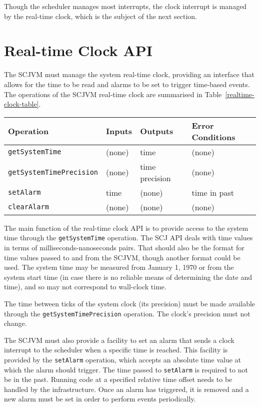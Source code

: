 Though the scheduler manages most interrupts, the clock interrupt is
managed by the real-time clock, which is the subject of the next section.

\section{Real-time Clock API}
\label{realtime-clock-section}

The SCJVM must manage the system real-time clock, providing an
interface that allows for the time to be read and alarms to be set to
trigger time-based events.
The operations of the SCJVM real-time clock are summarised in
Table~\ref{realtime-clock-table}.

\begin{table*}[ht]
  \centering
  \footnotesize
  \begin{tabular}{|l|p{1.2cm}|p{2cm}|p{2.6cm}|}
    Operation & Inputs & Outputs & Error Conditions \\
    \hline
    \texttt{getSystemTime} &
    (none) &
    time &
    (none)
    \\\texttt{getSystemTimePrecision} &
    (none) &
    time precision &
    (none)
    \\\texttt{setAlarm} &
    time &
    (none) &
    time in past
    \\\texttt{clearAlarm} &
    (none) &
    (none) &
    (none)
  \end{tabular}
  \caption{The operations of the SCJVM real-time clock}
  \label{realtime-clock-table}
\end{table*}

The main function of the real-time clock API is to provide access to
the system time through the \texttt{get\-System\-Time} operation.
The SCJ API deals with time values in terms of
milliseconds-nanoseconds pairs.
That should also be the format for time values passed to and from the
SCJVM, though another format could be used.
The system time may be measured from January 1, 1970 or from the
system start time (in case there is no reliable means of determining
the date and time), and so may not correspond to wall-clock time.

The time between ticks of the system clock (its precision) must be
made available through the \texttt{get\-System\-Time\-Precision}
operation.
The clock's precision must not change.

The SCJVM must also provide a facility to set an alarm that sends a
clock interrupt to the scheduler when a specific time is reached.
This facility is provided by the \texttt{set\-Alarm} operation, which
accepts an absolute time value at which the alarm should trigger.
The time passed to \texttt{set\-Alarm} is required to not be in the
past.
Running code at a specified relative time offset needs to be handled by
the infrastructure.
Once an alarm has triggered, it is removed and a new alarm must be set
in order to perform events periodically.

